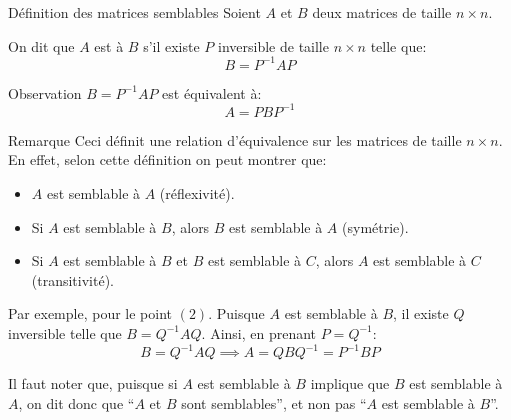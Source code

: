 \documentclass[a4paper]{article}
\begin{document}
\begin{parag}{Définition des matrices semblables}
    Soient $A$ et $B$ deux matrices de taille $n \times n$.

    On dit que $A$ est  à $B$ s'il existe $P$ inversible de taille $n \times n$ telle que: 
    \[B = P^{-1} A P\]

    \begin{subparag}{Observation}
        $B = P^{-1} A P$ est équivalent à: 
        \[A = PBP^{-1}\]
    \end{subparag}

    \begin{subparag}{Remarque}
        Ceci définit une relation d'équivalence sur les matrices de taille $n \times n$. En effet, selon cette définition on peut montrer que:
        \begin{itemize}
            \item $A$ est semblable à $A$ (réflexivité).
            \item Si $A$ est semblable à $B$, alors $B$ est semblable à $A$ (symétrie).
            \item Si $A$ est semblable à $B$ et $B$ est semblable à $C$, alors $A$ est semblable à $C$ (transitivité).
        \end{itemize}

        Par exemple, pour le point $\left(2\right)$. Puisque $A$ est semblable à $B$, il existe $Q$ inversible telle que $B = Q^{-1} A Q$. Ainsi, en prenant $P = Q^{-1}$: 
        \[B = Q^{-1} A Q \implies A = QBQ^{-1} = P^{-1}BP\]

        Il faut noter que, puisque si $A$ est semblable à $B$ implique que $B$ est semblable à $A$, on dit donc que ``$A$ et $B$ sont semblables'', et non pas ``$A$ est semblable à $B$''.
    \end{subparag}
\end{parag}
\end{document}
